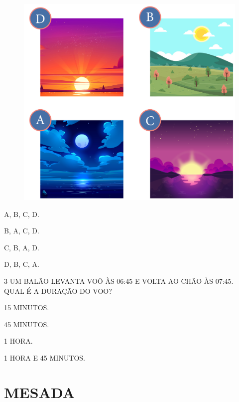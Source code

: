 \begin{figure}[htpb!]
\centering
\includegraphics[width=.6\textwidth]{../ilustracoes/MAT1/SAEB_1ANO_MAT_FIGURA62.png}
\end{figure}

\begin{escolha}
\item A, B, C, D.

\item B, A, C, D.

\item C, B, A, D.

\item D, B, C, A.
\end{escolha}

\num{3} UM BALÃO LEVANTA VOÔ ÀS 06:45 E VOLTA AO CHÃO ÀS 07:45. QUAL É A DURAÇÃO DO VOO?

\begin{escolha}
\item 15 MINUTOS.

\item 45 MINUTOS.

\item 1 HORA.

\item 1 HORA E 45 MINUTOS.
\end{escolha}

\chapter{MESADA}

\vspace*{-2cm}

